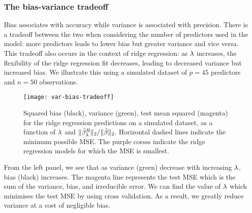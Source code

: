 \documentclass{report}
\newcommand{\gbh}{\hat{\gb}}
\begin{document}
	\subsubsection{The bias-variance tradeoff}
	Bias associates with accuracy while variance is associated with precision. There is a tradeoff between the two when considering the number of predictors used in the model: more predictors leads to lower bias but greater variance and vice versa. \\
	
	This tradeoff also occurs in the context of ridge regression: as $\lambda$ increases, the flexibility of the ridge regression fit decreases, leading to decreased variance but increased bias. We illustrate this using a simulated dataset of $p=45$ predictors and $n=50$ observations.
	\begin{figure}[h]
		\centering
		\texttt{[image: var-bias-tradeoff]}
		\caption{Squared bias (black), variance (green), test mean squared (magenta) for the ridge regression predictions on a simulated dataset, as a function of $\lambda$ and $\|\gbh_{\lm}^R\|_2/\|\gbh\|_2$. Horizontal dashed lines indicate the minimum possible MSE. The purple corsss indicate the ridge regression models for which the MSE is smallest.}
		\label{fig:var-bias-tradeoff}
	\end{figure}
	
	From the left panel, we see that as variance (green) decrease with increasing $\lambda$, bias (black) increases. The magenta line represents the test MSE which is the sum of the variance, bias, and irreducible error. We can find the value of $\lambda$ which minimises the test MSE by using cross validation. As a result, we greatly reduce variance at a cost of negligible bias. 
	
\end{document}
